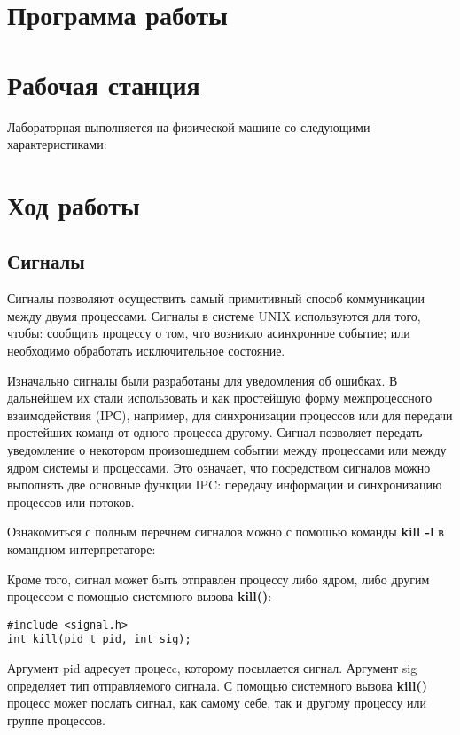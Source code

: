 \documentclass[a4paper]{article}
\begin{document}
\section{Программа работы}
	
\section{Рабочая станция}
	Лабораторная выполняется на физической машине со следующими характеристиками:
	
	
\section{Ход работы}

\subsection{Сигналы}
	Сигналы позволяют осуществить самый примитивный способ коммуникации между двумя процессами. Сигналы в системе UNIX используются для того, чтобы: сообщить процессу о том, что возникло асинхронное событие; или необходимо обработать исключительное состояние.
	
	Изначально сигналы были разработаны для уведомления об ошибках. В дальнейшем их стали использовать и как простейшую форму межпроцессного взаимодействия (IPС), например, для синхронизации процессов или для передачи простейших команд от одного процесса другому. Сигнал позволяет передать уведомление о некотором произошедшем событии между процессами или между ядром системы и процессами. Это означает, что посредством сигналов можно выполнять две основные функции IPC: передачу информации и синхронизацию процессов или потоков.
	
	Ознакомиться с полным перечнем сигналов можно с помощью команды \textbf{kill -l} в командном интерпретаторе:
	

	Кроме того, сигнал может быть отправлен процессу либо ядром, либо другим процессом с помощью системного вызова \textbf{kill()}:
	\begin{lstlisting}[style=crs_cpp]
#include <signal.h>
int kill(pid_t pid, int sig);		
	\end{lstlisting}
	Аргумент pid адресует процесc, которому посылается сигнал. Аргумент sig определяет тип отправляемого сигнала. С помощью системного вызова \textbf{kill()} процесс может послать сигнал, как самому себе, так и другому процессу или группе процессов.
	
\end{document}
